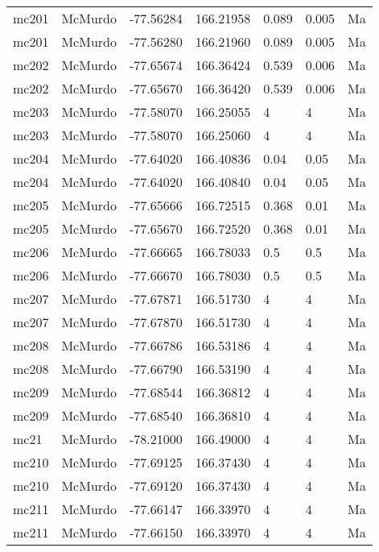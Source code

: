 \documentclass{article}
\begin{document}
\begin{longtable}{llrrlll}
 mc201 &  McMurdo & -77.56284 &  166.21958 &   0.089 &     0.005 &    Ma \\
 mc201 &  McMurdo & -77.56280 &  166.21960 &   0.089 &     0.005 &    Ma \\
 mc202 &  McMurdo & -77.65674 &  166.36424 &   0.539 &     0.006 &    Ma \\
 mc202 &  McMurdo & -77.65670 &  166.36420 &   0.539 &     0.006 &    Ma \\
 mc203 &  McMurdo & -77.58070 &  166.25055 &       4 &         4 &    Ma \\
 mc203 &  McMurdo & -77.58070 &  166.25060 &       4 &         4 &    Ma \\
 mc204 &  McMurdo & -77.64020 &  166.40836 &    0.04 &      0.05 &    Ma \\
 mc204 &  McMurdo & -77.64020 &  166.40840 &    0.04 &      0.05 &    Ma \\
 mc205 &  McMurdo & -77.65666 &  166.72515 &   0.368 &      0.01 &    Ma \\
 mc205 &  McMurdo & -77.65670 &  166.72520 &   0.368 &      0.01 &    Ma \\
 mc206 &  McMurdo & -77.66665 &  166.78033 &     0.5 &       0.5 &    Ma \\
 mc206 &  McMurdo & -77.66670 &  166.78030 &     0.5 &       0.5 &    Ma \\
 mc207 &  McMurdo & -77.67871 &  166.51730 &       4 &         4 &    Ma \\
 mc207 &  McMurdo & -77.67870 &  166.51730 &       4 &         4 &    Ma \\
 mc208 &  McMurdo & -77.66786 &  166.53186 &       4 &         4 &    Ma \\
 mc208 &  McMurdo & -77.66790 &  166.53190 &       4 &         4 &    Ma \\
 mc209 &  McMurdo & -77.68544 &  166.36812 &       4 &         4 &    Ma \\
 mc209 &  McMurdo & -77.68540 &  166.36810 &       4 &         4 &    Ma \\
  mc21 &  McMurdo & -78.21000 &  166.49000 &       4 &         4 &    Ma \\
 mc210 &  McMurdo & -77.69125 &  166.37430 &       4 &         4 &    Ma \\
 mc210 &  McMurdo & -77.69120 &  166.37430 &       4 &         4 &    Ma \\
 mc211 &  McMurdo & -77.66147 &  166.33970 &       4 &         4 &    Ma \\
 mc211 &  McMurdo & -77.66150 &  166.33970 &       4 &         4 &    Ma \\

\end{longtable}
\end{document}
